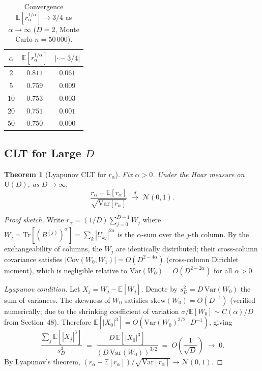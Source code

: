 \documentclass[12pt,a4paper]{article}
\newtheorem{theorem}{Theorem}[section]
\begin{document}
\begin{table}[h]
\centering
\caption{Convergence $\mathbb{E}[r_\alpha^{1/\alpha}]\to3/4$ as $\alpha\to\infty$ ($D=2$,
Monte Carlo $n=50\,000$).}
\label{tab:minent_limit}
\begin{tabular}{c|c|c}
\hline
$\alpha$ & $\mathbb{E}[r_\alpha^{1/\alpha}]$ & $|\cdot - 3/4|$ \\
\hline
$2$ & $0.811$ & $0.061$ \\
$5$ & $0.759$ & $0.009$ \\
$10$ & $0.753$ & $0.003$ \\
$20$ & $0.751$ & $0.001$ \\
$50$ & $0.750$ & $0.000$ \\
\hline
\end{tabular}
\end{table}

\subsection{CLT for Large $D$}
\label{subsec:clt}

\begin{theorem}[Lyapunov CLT for $r_\alpha$]\label{thm:clt_r_alpha}
Fix $\alpha>0$.  Under the Haar measure on $\mathrm{U}(D)$, as $D\to\infty$,
\[
  \frac{r_\alpha - \mathbb{E}[r_\alpha]}{\sqrt{\mathrm{Var}[r_\alpha]}}
  \;\xrightarrow{d}\; \mathcal{N}(0,1).
\]
\end{theorem}

\begin{proof}[Proof sketch]
Write $r_\alpha=(1/D)\sum_{j=0}^{D-1}W_j$ where $W_j=\mathrm{Tr}[(B^{(j)})^\alpha]
=\sum_k|U_{kj}|^{2\alpha}$ is the $\alpha$-sum over the $j$-th column.
By the exchangeability of columns, the $W_j$ are identically distributed; their
cross-column covariance satisfies $|\mathrm{Cov}(W_0,W_1)|=O(D^{2-4\alpha})$
(cross-column Dirichlet moment), which is negligible relative to
$\mathrm{Var}(W_0)=O(D^{2-2\alpha})$ for all $\alpha>0$.

\textit{Lyapunov condition.}  Let $X_j=W_j-\mathbb{E}[W_j]$.
Denote by $s_D^2=D\,\mathrm{Var}(W_0)$ the sum of variances.
The skewness of $W_0$ satisfies $\mathrm{skew}(W_0)=O(D^{-1})$
(verified numerically; due to the shrinking coefficient of variation
$\sigma/\mathbb{E}[W_0]\sim C(\alpha)/D$ from Section~48).  Therefore
$\mathbb{E}[|X_0|^3]=O(\mathrm{Var}(W_0)^{3/2}\cdot D^{-1})$, giving
\[
  \frac{\sum_j\mathbb{E}[|X_j|^3]}{s_D^3}
  \;=\;\frac{D\,\mathbb{E}[|X_0|^3]}{(D\,\mathrm{Var}(W_0))^{3/2}}
  \;=\;O\!\left(\frac{1}{\sqrt{D}}\right)\;\to\;0.
\]
By Lyapunov's theorem, $(r_\alpha-\mathbb{E}[r_\alpha])/\sqrt{\mathrm{Var}[r_\alpha]}\to\mathcal{N}(0,1)$.
\end{proof}
\end{document}
